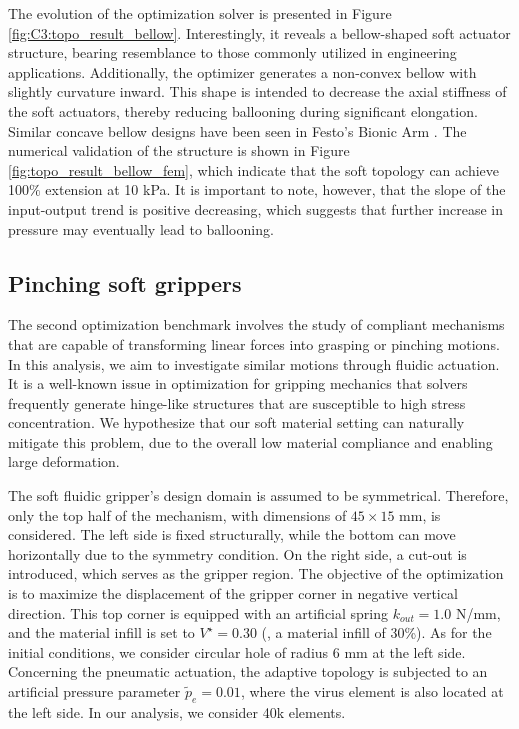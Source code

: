 The evolution of the optimization solver is presented in Figure \ref{fig:C3:topo_result_bellow}. Interestingly, it reveals a bellow-shaped soft actuator structure, bearing resemblance to those commonly utilized in engineering applications. Additionally, the optimizer generates a non-convex bellow with  slightly curvature inward. This shape is intended to decrease the axial stiffness of the soft actuators, thereby reducing ballooning during significant elongation. Similar concave bellow designs have been seen in Festo's Bionic Arm \cite{Hairer2002}. The numerical validation of the structure is shown in Figure \ref{fig:topo_result_bellow_fem}, which indicate that the soft topology can achieve 100$\%$ extension at 10 \si{\kilo \pascal}. It is important to note, however, that the slope of the input-output trend is positive decreasing, which suggests that further increase in pressure may eventually lead to ballooning.

\subsection{Pinching soft grippers}
The second optimization benchmark involves the study of compliant mechanisms that are capable of transforming linear forces into grasping or pinching motions. In this analysis, we aim to investigate similar motions through fluidic actuation. It is a well-known issue in optimization for gripping mechanics that solvers frequently generate hinge-like structures that are susceptible to high stress concentration. We hypothesize that our soft material setting can naturally mitigate this problem, due to the overall low material compliance and enabling large deformation.

The soft fluidic gripper's design domain is assumed to be symmetrical. Therefore, only the top half of the mechanism, with dimensions of $45 \times 15$ \si{\milli \meter}, is considered. The left side is fixed structurally, while the bottom can move horizontally due to the symmetry condition. On the right side, a cut-out is introduced, which serves as the gripper region. The objective of the optimization is to maximize the displacement of the gripper corner in negative vertical direction. This top corner is equipped with an artificial spring $k_{out} = 1.0$ N/mm, and the material infill is set to $V^\star = 0.30$ (\ie, a material infill of 30\%). As for the initial conditions, we consider circular hole of radius $6$ \si{\milli \meter} at the left side. Concerning the pneumatic actuation, the adaptive topology is subjected to an artificial pressure parameter $\tilde{p}_e = 0.01$, where the virus element is also located at the left side. In our analysis, we consider 40k elements.

